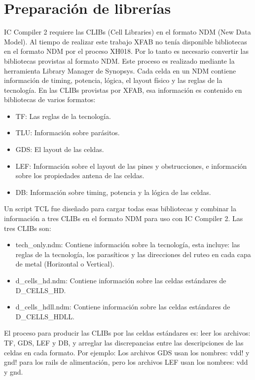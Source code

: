 \documentclass[a4paper, twoside, 11pt]{report}
\begin{document}
\section{Preparación de librerías}

IC Compiler 2 requiere las CLIBs (Cell Libraries) en el formato NDM (New Data Model). Al tiempo de realizar este trabajo XFAB no tenía disponible bibliotecas en el formato NDM por el proceso XH018. Por lo tanto es necesario convertir las bibliotecas provistas al formato NDM. Este proceso es realizado mediante la herramienta Library Manager de Synopsys. Cada celda en un NDM contiene información de timing, potencia, lógica, el layout físico y las reglas de la tecnología. En las CLIBs provistas por XFAB, esa información es contenido en bibliotecas de varios formatos:

\begin{itemize}
  \item TF: Las reglas de la tecnología.
  \item TLU: Información sobre parásitos.
  \item GDS: El layout de las celdas.
  \item LEF: Información sobre el layout de las pines y obstrucciones, e información sobre los propiedades antena de las celdas.
  \item DB: Información sobre timing, potencia y la lógica de las celdas.
\end{itemize}

Un script TCL fue diseñado para cargar todas esas bibliotecas y combinar la información a tres CLIBs en el formato NDM para uso con IC Compiler 2. Las tres CLIBs son:

\begin{itemize}
  \item tech\_only.ndm: Contiene información sobre la tecnología, esta incluye: las reglas de la tecnología, los parasíticos y las direcciones del ruteo en cada capa de metal (Horizontal o Vertical).
  \item d\_cells\_hd.ndm: Contiene información sobre las celdas estándares de D\_CELLS\_HD.
  \item d\_cells\_hdll.ndm: Contiene información sobre las celdas estándares de D\_CELLS\_HDLL.
\end{itemize}

El proceso para producir las CLIBs por las celdas estándares es: leer los archivos: TF, GDS, LEF y DB, y arreglar las discrepancias entre las descripciones de las celdas en cada formato. Por ejemplo: Los archivos GDS usan los nombres: vdd! y gnd! para los rails de alimentación, pero los archivos LEF usan los nombres: vdd y gnd.
\end{document}
